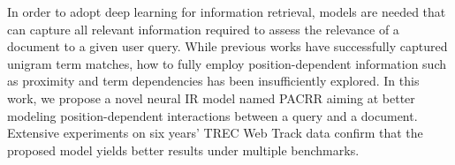 In order to adopt deep learning for information retrieval, models are needed that can capture all relevant information required to assess the relevance of a document to a given user query. While previous works have successfully captured unigram term matches, how to fully employ position-dependent information such as proximity and term dependencies has been insufficiently explored. In this work, we propose a novel neural IR model named PACRR aiming at better modeling position-dependent interactions between a query and a document. Extensive experiments on six years' TREC Web Track data confirm that the proposed model yields better results under multiple benchmarks.
